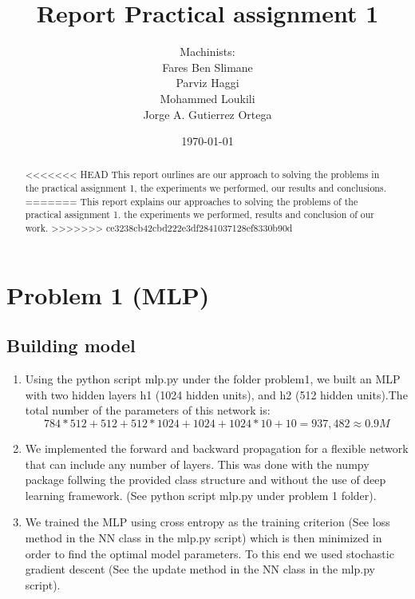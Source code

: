 \documentclass[a4paper]{article}
\title{Report Practical assignment 1}
\author{Machinists:\vspace{0.5cm}\\
Fares Ben Slimane \\
Parviz Haggi \\
Mohammed Loukili \\
Jorge A. Gutierrez Ortega
}
\date{\today}
\begin{document}
\maketitle

\begin{abstract}
<<<<<<< HEAD
This report ourlines are our approach to solving the problems in the practical assignment 1, the experiments we performed, our results and conclusions.
=======
This report explains our approaches to solving the problems of the practical assignment 1. the experiments we performed, results and conclusion of our work.
>>>>>>> ce3238cb42cbd222e3df2841037128ef8330b90d
\end{abstract}

\section{Problem 1 (MLP)}
\label{sec:problem1}

\subsection{Building model}

\begin{enumerate}
  \item Using the python script mlp.py under the folder problem1, we built an MLP with two hidden layers h1 (1024 hidden units), and h2 (512 hidden units).The total number of the parameters of this network is: 
  $$ 784*512 + 512 + 512*1024 + 1024 + 1024*10 + 10 = 937,482 \approx 0.9 M$$
  
  \item We implemented the forward and backward propagation for a flexible network that can include  any number of layers. This was done with the numpy package follwing the provided class structure and without the use of deep learning framework. (See python script mlp.py under problem 1 folder).
  
  \item We trained the MLP using cross entropy as the training criterion (See loss method in the NN class in the mlp.py script) which is then minimized in order to find the optimal model parameters. To this end we used  stochastic gradient descent (See the update method in the NN class in the mlp.py script). 
  
\end{enumerate}
\end{document}
